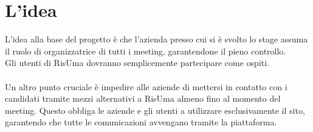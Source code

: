 \section{L'idea}
L'idea alla base del progetto è che l'azienda presso cui si è svolto lo stage assuma il ruolo di organizzatrice 
di tutti i meeting, garantendone il pieno controllo. 
\\
Gli utenti di RisUma dovranno semplicemente partecipare come ospiti.
\\
\\
Un altro punto cruciale è impedire alle aziende di mettersi in contatto con i candidati 
tramite mezzi alternativi a RisUma almeno fino al momento del meeting. Questo obbliga le aziende e gli utenti a 
utilizzare esclusivamente il sito, garantendo che tutte le comunicazioni avvengano tramite la piattaforma.